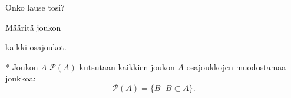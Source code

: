 \begin{tehtavasivu}
\begin{tehtava}
     Onko lause tosi?
    \begin{alakohdat}
        \alakohta{$-3 \in \nn$}
        \alakohta{$\pi \in \rr \setminus \qq$}
        \alakohta{$\emptyset \subset \zz$}
    \end{alakohdat}

    \begin{vastaus}
    
        \begin{alakohdat}
        \end{alakohdat}
    \end{vastaus}
    
\end{tehtava}

\begin{tehtava}
     Määritä joukon
    \begin{alakohdat}
    \end{alakohdat}
kaikki osajoukot.
    \begin{vastaus}
    
        \begin{alakohdat}

        \end{alakohdat}
    \end{vastaus}
    
\end{tehtava}

\begin{tehtava}
*
Joukon $A$  $\mathcal{P}(A)$ kutsutaan kaikkien joukon $A$ osajoukkojen muodostamaa joukkoa:
\[
\mathcal{P}(A)=\{ B \, | \, B\subset A\}.
\]
    \begin{alakohdat}
    \end{alakohdat}


\end{tehtava}
\end{tehtavasivu}
